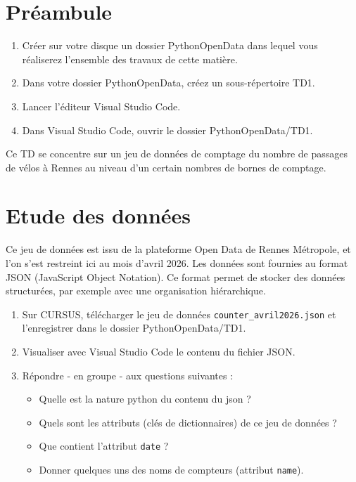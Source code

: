 \documentclass[11pt,a4paper]{article}
\begin{document}

\section*{Préambule}
\begin{enumerate}
    \item Créer sur votre disque un dossier PythonOpenData dans lequel vous réaliserez l'ensemble des travaux de cette matière. 
    \item Dans votre dossier PythonOpenData, créez un sous-répertoire TD1.
    \item Lancer l'éditeur Visual Studio Code.
    \item Dans Visual Studio Code, ouvrir le dossier PythonOpenData/TD1. 
\end{enumerate}

Ce TD se concentre sur un jeu de données de comptage du nombre de passages de vélos à Rennes au niveau d'un certain nombres de bornes de comptage. 


\section{Etude des données}

Ce jeu de données est issu de la plateforme Open Data de Rennes Métropole, et l'on s'est restreint ici au mois d'avril 2026. Les données sont fournies au format JSON (JavaScript Object Notation). Ce format permet de stocker des données structurées, par exemple avec une organisation hiérarchique.

\begin{enumerate}
    \item Sur CURSUS, télécharger le jeu de données \verb+counter_avril2026.json+ et l'enregistrer dans le dossier PythonOpenData/TD1.
    \item Visualiser avec Visual Studio Code le contenu du fichier JSON.
    \item Répondre - en groupe - aux questions suivantes : 
    \begin{itemize}
        \item Quelle est la nature python du contenu du json ?
         \item Quels sont les attributs (clés de dictionnaires) de ce jeu de données ? 
         \item Que contient l'attribut \verb+date+ ?
         \item Donner quelques uns des noms de compteurs (attribut \verb+name+).
    \end{itemize}
   
\end{enumerate}
\end{document}
